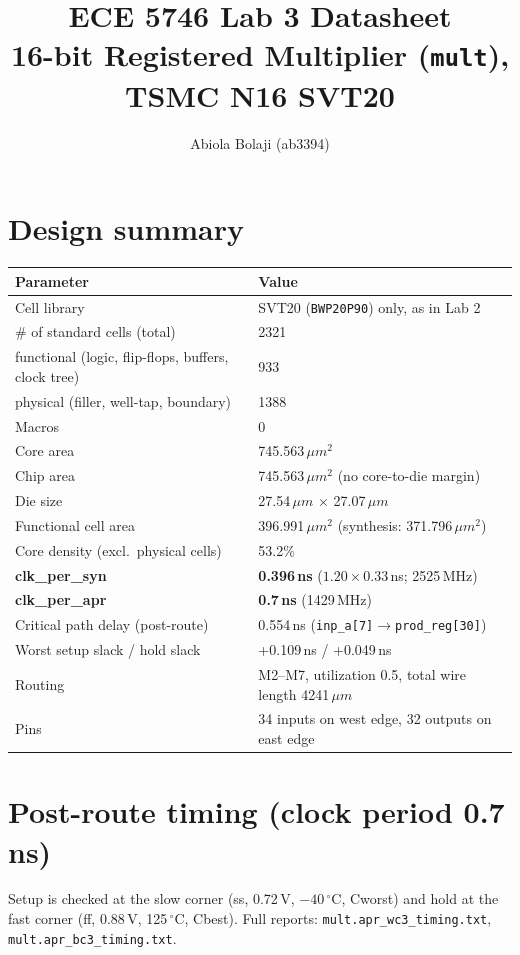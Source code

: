 \documentclass[11pt]{article}
\title{ECE 5746 Lab 3 Datasheet\\\large 16-bit Registered Multiplier (\texttt{mult}), TSMC N16 SVT20}
\author{Abiola Bolaji (ab3394)}
\date{}
\begin{document}
\maketitle

\section*{Design summary}
\begin{center}\small
\begin{tabular}{l|l}
\hline
Parameter & Value \\
\hline
Cell library & SVT20 (\texttt{BWP20P90}) only, as in Lab 2 \\
\# of standard cells (total) & 2321 \\
\quad functional (logic, flip-flops, buffers, clock tree) & 933 \\
\quad physical (filler, well-tap, boundary) & 1388 \\
Macros & 0 \\
Core area & 745.563\,$\mu m^2$ \\
Chip area & 745.563\,$\mu m^2$ (no core-to-die margin) \\
Die size & 27.54\,$\mu m$ $\times$ 27.07\,$\mu m$ \\
Functional cell area & 396.991\,$\mu m^2$ (synthesis: 371.796\,$\mu m^2$) \\
Core density (excl.\ physical cells) & 53.2\% \\
\textbf{clk\_per\_syn} & \textbf{0.396\,ns} ($1.20 \times 0.33$\,ns; 2525\,MHz) \\
\textbf{clk\_per\_apr} & \textbf{0.7\,ns} (1429\,MHz) \\
Critical path delay (post-route) & 0.554\,ns (\texttt{inp\_a[7]}$\rightarrow$\texttt{prod\_reg[30]}) \\
Worst setup slack / hold slack & +0.109\,ns / +0.049\,ns \\
Routing & M2--M7, utilization 0.5, total wire length 4241\,$\mu m$ \\
Pins & 34 inputs on west edge, 32 outputs on east edge \\
\hline
\end{tabular}
\end{center}

\section*{Post-route timing (clock period 0.7\,ns)}
Setup is checked at the slow corner (ss, 0.72\,V, $-40\,^\circ$C, Cworst) and hold at the fast
corner (ff, 0.88\,V, 125\,$^\circ$C, Cbest). Full reports: \texttt{mult.apr\_wc3\_timing.txt},
\texttt{mult.apr\_bc3\_timing.txt}.
\end{document}
